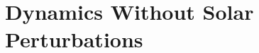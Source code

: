 \chapter{Dynamics Without Solar Perturbations}
\label{chap:dynamics_without_solar_perturbations}
\graphicspath{{Results/}}
